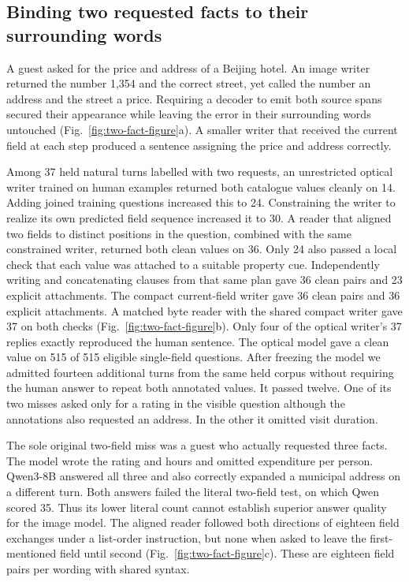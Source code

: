 \subsection*{Binding two requested facts to their surrounding words}
A guest asked for the price and address of a Beijing hotel. An image writer returned the number 1,354 and the correct street, yet called the number an address and the street a price. Requiring a decoder to emit both source spans secured their appearance while leaving the error in their surrounding words untouched (Fig.~\ref{fig:two-fact-figure}a). A smaller writer that received the current field at each step produced a sentence assigning the price and address correctly.

Among 37 held natural turns labelled with two requests, an unrestricted optical writer trained on human examples returned both catalogue values cleanly on 14. Adding joined training questions increased this to 24. Constraining the writer to realize its own predicted field sequence increased it to 30. A reader that aligned two fields to distinct positions in the question, combined with the same constrained writer, returned both clean values on 36. Only 24 also passed a local check that each value was attached to a suitable property cue. Independently writing and concatenating clauses from that same plan gave 36 clean pairs and 23 explicit attachments. The compact current-field writer gave 36 clean pairs and 36 explicit attachments. A matched byte reader with the shared compact writer gave 37 on both checks (Fig.~\ref{fig:two-fact-figure}b). Only four of the optical writer's 37 replies exactly reproduced the human sentence. The optical model gave a clean value on 515 of 515 eligible single-field questions. After freezing the model we admitted fourteen additional turns from the same held corpus without requiring the human answer to repeat both annotated values. It passed twelve. One of its two misses asked only for a rating in the visible question although the annotations also requested an address. In the other it omitted visit duration.

The sole original two-field miss was a guest who actually requested three facts. The model wrote the rating and hours and omitted expenditure per person. Qwen3-8B answered all three and also correctly expanded a municipal address on a different turn. Both answers failed the literal two-field test, on which Qwen scored 35. Thus its lower literal count cannot establish superior answer quality for the image model. The aligned reader followed both directions of eighteen field exchanges under a list-order instruction, but none when asked to leave the first-mentioned field until second (Fig.~\ref{fig:two-fact-figure}c). These are eighteen field pairs per wording with shared syntax.

